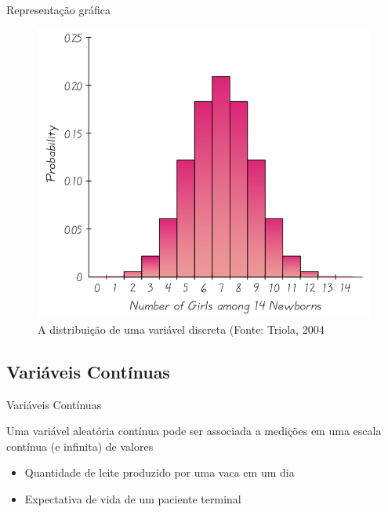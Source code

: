 \documentclass{beamer}
\begin{document}
\begin{frame}{Representação gráfica}
  \begin{figure}
    \centering
    \includegraphics[height=0.6\textheight]{Prob_II/discreta}
    \caption{A distribuição de uma variável discreta (Fonte: Triola,
      2004}
  \end{figure}
\end{frame}

\subsection{Variáveis Contínuas}
\begin{frame}{Variáveis Contínuas}
  \begin{definition}
    Uma variável aleatória \alert{contínua} pode ser associada a
    medições em uma escala contínua (e infinita) de valores
  \end{definition}
  \begin{example}
    \begin{itemize}
    \item Quantidade de leite produzido por uma vaca em um dia
    \item Expectativa de vida de um paciente terminal
    \end{itemize}    
  \end{example}
\end{frame}

\end{document}
